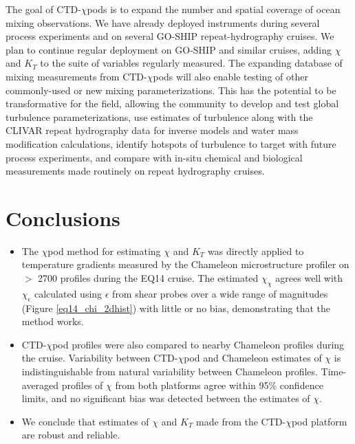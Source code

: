 \documentclass{ametsoc}
\begin{document}
The goal of CTD-$\chi$pods is to expand the number and spatial coverage of ocean mixing observations. We have already deployed instruments during several process experiments and on several GO-SHIP repeat-hydrography cruises. We plan to continue regular deployment on GO-SHIP and similar cruises, adding $\chi$ and $K_T$ to the suite of variables regularly measured. The expanding database of mixing measurements from CTD-$\chi$pods will also enable testing of other commonly-used or new mixing parameterizations. This has the potential to be transformative for the field, allowing the community to 
develop and test global turbulence parameterizations, use estimates of turbulence along with the CLIVAR repeat hydrography data for inverse models and water mass modification calculations, identify hotspots of turbulence to target with future process experiments, and compare with in-situ chemical and biological measurements made routinely on repeat hydrography cruises.


\section{Conclusions}

\begin{itemize}
\item The $\chi$pod method for estimating $\chi$ and $K_T$ was directly applied to temperature gradients measured by the Chameleon microstructure profiler on $>$ 2700 profiles during the EQ14 cruise. The estimated $\chi_{\chi}$ agrees well with $\chi_{\epsilon}$ calculated using $\epsilon$ from shear probes over a wide range of magnitudes (Figure \ref{eq14_chi_2dhist}) with little or no bias, demonstrating that the method works.
\item CTD-$\chi$pod profiles were also compared to nearby Chameleon profiles during the cruise. Variability between CTD-$\chi$pod and Chameleon estimates of $\chi$ is indistinguishable from natural variability between Chameleon profiles. Time-averaged profiles of $\chi$ from both platforms agree within 95\% confidence limits, and no significant bias was detected between the estimates of $\chi$.
\item We conclude that estimates of $\chi$ and $K_T$ made from the CTD-$\chi$pod platform are robust and reliable.
\end{itemize}
\end{document}
